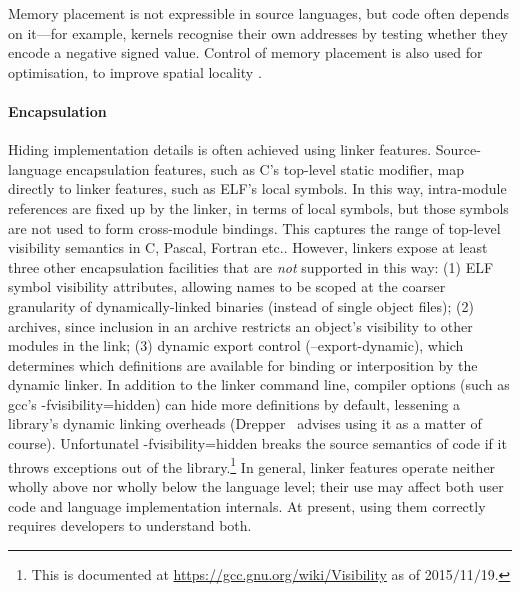 Memory placement is not expressible in source languages, 
but code often depends on it---for example, kernels recognise their own addresses
by testing whether they encode a negative signed value.
Control of memory placement is also used for optimisation, 
to improve spatial locality \citep{orr_dynamic_1994}.


\paragraph{Encapsulation}
Hiding implementation details is often achieved using linker features. 
Source-language encapsulation features, such as C's top-level \textsf{static} modifier, 
map directly to linker features, such as ELF's local symbols.
In this way, intra-module references are fixed up by the linker, in terms of local symbols, 
but those symbols are not used to form cross-module bindings.
This captures the range of top-level visibility semantics in C, Pascal, Fortran etc..
However, linkers expose at least three other encapsulation facilities
that are \emph{not} supported in this way: (1) ELF symbol visibility attributes,
allowing names to be scoped at the coarser granularity of 
dynamically-linked binaries (instead of single object files);
(2) archives,
since inclusion in an archive restricts an object's visibility 
to other modules in the link;
(3) dynamic export control (\textsf{--export-dynamic}), which determines 
which definitions are available for binding or interposition by the dynamic linker.
In addition to the linker command line, 
compiler options (such as \textsf{gcc}'s \textsf{-fvisibility=hidden})
can hide more definitions by default, lessening a library's dynamic linking overheads
(Drepper~\citet{drepper} advises using it as a matter of course).
Unfortunatel \textsf{-fvisibility=hidden} breaks the source semantics of \Cplusplus{} code 
if it throws exceptions out of the library.\footnote{This is documented at \url{https://gcc.gnu.org/wiki/Visibility}
as of 2015$/$11$/$19.}
In general, linker features operate neither wholly above nor wholly below the language level; 
their use may affect both user code and language implementation internals.
At present, using them correctly requires developers to understand both.

